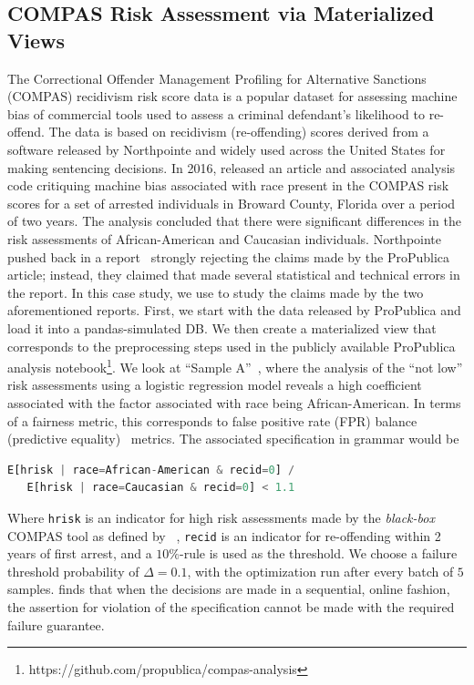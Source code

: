 \subsection{COMPAS Risk Assessment via Materialized Views}
The Correctional Offender Management Profiling for
Alternative Sanctions (COMPAS) recidivism risk score data is a popular dataset for assessing machine bias of commercial tools used to assess a criminal defendant's likelihood to re-offend.
The data is based on recidivism (re-offending) scores derived from a software released by Northpointe and widely used across the United States for making sentencing decisions.
In 2016, \citet{angwin2016machine} released an article and associated analysis code critiquing machine bias associated with race present in the COMPAS risk scores for a set of arrested individuals in Broward County, Florida over a period of two years.
The analysis concluded that there were significant differences in the risk assessments of African-American and Caucasian individuals.
Northpointe pushed back in a report~\citep{dieterich2016compas} strongly rejecting the claims made by the ProPublica article; instead, they claimed that \citet{angwin2016machine} made several statistical and technical errors in the report.
In this case study, we use \AVOIRmethodname{} to study the claims made by the two aforementioned reports. 
First, we start with the data released by ProPublica and load it into a pandas-simulated DB.
We then create a materialized view that corresponds to the preprocessing steps used in the publicly available ProPublica analysis  notebook\footnote{https://github.com/propublica/compas-analysis}.
We look at ``Sample A''~\citep{dieterich2016compas}, where the analysis of the ``not low'' risk assessments using a logistic regression model reveals a high coefficient associated with the factor associated with race being African-American.
In terms of a fairness metric, this corresponds to false positive rate (FPR) balance (predictive equality)~\citep{verma2018fairness} metrics. 
The associated specification in \AVOIRmethodname{} grammar would be

\begin{lstlisting}[columns=flexible, language=Python]
   E[hrisk | race=African-American & recid=0] / 
   E[hrisk | race=Caucasian & recid=0] < 1.1
\end{lstlisting}

Where \verb|hrisk| is an indicator for high risk assessments made by the \emph{black-box} COMPAS tool as defined by ~\citet{angwin2016machine},  \verb|recid| is an indicator for re-offending within 2 years of first arrest, and a $10\%$-rule is used as the threshold. 
We choose a failure threshold probability of $\Delta = 0.1$, with the optimization run after every batch of $5$ samples.
\AVOIRmethodname{} finds that when the decisions are made in a sequential, online fashion, the assertion for violation of the specification cannot be made with the required failure guarantee.

